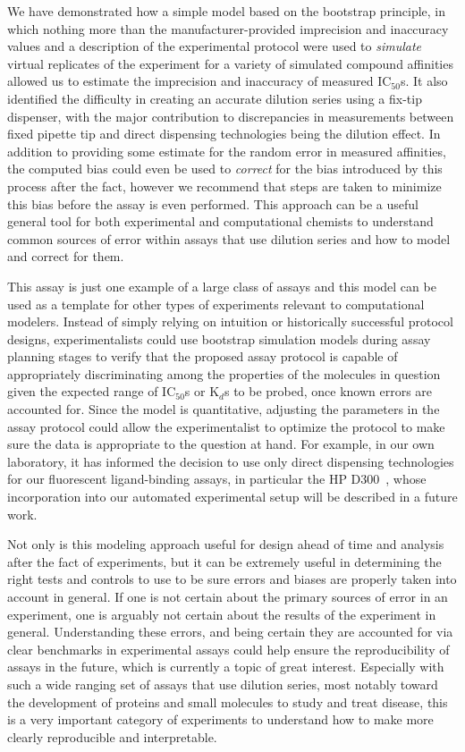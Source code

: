 \documentclass[aps,pre,twocolumn,nofootinbib,superscriptaddress,linenumbers]{revtex4-1}
\begin{document}
We have demonstrated how a simple model based on the bootstrap principle, in which nothing more than the manufacturer-provided imprecision and inaccuracy values and a description of the experimental protocol were used to \emph{simulate} virtual replicates of the experiment for a variety of simulated compound affinities allowed us to estimate the imprecision and inaccuracy of measured IC$_{50}$s.
It also identified the difficulty in creating an accurate dilution series using a fix-tip dispenser, with the major contribution to discrepancies in measurements between fixed pipette tip and direct dispensing technologies being the dilution effect. 
In addition to providing some estimate for the random error in measured affinities, the computed bias could even be used to \emph{correct} for the bias introduced by this process after the fact, however we recommend that steps are taken to minimize this bias before the assay is even performed. 
This approach can be a useful general tool for both experimental and computational chemists to understand common sources of error within assays that use dilution series and how to model and correct for them.

This assay is just one example of a large class of assays and this model can be used as a template for other types of experiments relevant to computational modelers.
Instead of simply relying on intuition or historically successful protocol designs, experimentalists could use bootstrap simulation models during assay planning stages to verify that the proposed assay protocol is capable of appropriately discriminating among the properties of the molecules in question given the expected range of IC$_{ 50}$s or K$_{d}$s to be probed, once known errors are accounted for.
Since the model is quantitative, adjusting the parameters in the assay protocol could allow the experimentalist to optimize the protocol to make sure the data is appropriate to the question at hand. 
For example, in our own laboratory, it has informed the decision to use only direct dispensing technologies for our fluorescent ligand-binding assays, in particular the HP D300~\cite{jones_alternative_2013}, whose incorporation into our automated experimental setup will be described in a future work.

Not only is this modeling approach useful for design ahead of time and analysis after the fact of experiments, but it can be extremely useful in determining the right tests and controls to use to be sure errors and biases are properly taken into account in general. If one is not certain about the primary sources of error in an experiment, one is arguably not certain about the results of the experiment in general. 
Understanding these errors, and being certain they are accounted for via clear benchmarks in experimental assays could help ensure the reproducibility of assays in the future, which is currently a topic of great interest. 
Especially with such a wide ranging set of assays that use dilution series, most notably toward the development of proteins and small molecules to study and treat disease, this is a very important category of experiments to understand how to make more clearly reproducible and interpretable.
\end{document}
